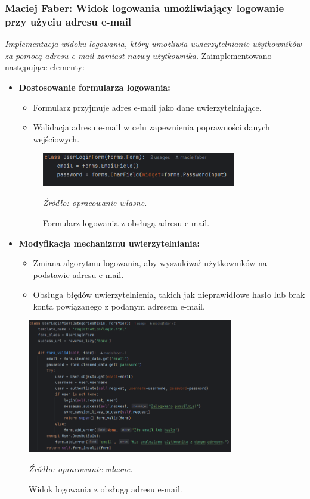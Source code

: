 \documentclass[12pt,a4paper,oneside]{article}
\theoremstyle{definition}
\numberwithin{equation}{section}
\begin{document}
\subsubsection{Maciej Faber: Widok logowania umożliwiający logowanie przy użyciu adresu e-mail}
\label{section:1.3.38}
\textit{
Implementacja widoku logowania, który umożliwia uwierzytelnianie użytkowników za pomocą adresu e-mail zamiast nazwy użytkownika.
}
Zaimplementowano następujące elementy:
\begin{itemize}
    \item \textbf{Dostosowanie formularza logowania:}
    \begin{itemize}
        \item Formularz przyjmuje adres e-mail jako dane uwierzytelniające.
        \item Walidacja adresu e-mail w celu zapewnienia poprawności danych wejściowych.
    \end{itemize}
    \begin{figure}[H]
        \centering
        \includegraphics[width=0.8\textwidth]{images/krzysztofBImages/login_form_view.png}
        \caption{Formularz logowania z obsługą adresu e-mail.}
        \emph{Źródło: opracowanie własne.}
        \label{fig:email_login_form}
    \end{figure}
    \item \textbf{Modyfikacja mechanizmu uwierzytelniania:}
    \begin{itemize}
        \item Zmiana algorytmu logowania, aby wyszukiwał użytkowników na podstawie adresu e-mail.
        \item Obsługa błędów uwierzytelnienia, takich jak nieprawidłowe hasło lub brak konta powiązanego z podanym adresem e-mail.
    \end{itemize}
\end{itemize}
\begin{figure}[H]
    \centering
    \includegraphics[width=0.8\textwidth]{images/krzysztofBImages/login_view.png}
    \caption{Widok logowania z obsługą adresu e-mail.}
    \emph{Źródło: opracowanie własne.}
    \label{fig:email_login}
\end{figure}
%
%
\end{document}
